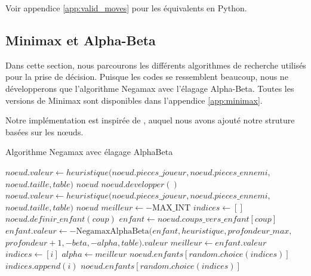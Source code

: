Voir appendice \ref{app:valid_moves} pour les équivalents en Python.

\subsection{Minimax et Alpha-Beta}
\label{subsec:minimax}
Dans cette section, nous parcourons les différents algorithmes de recherche utilisés pour la prise de décision. Puisque les codes se ressemblent beaucoup, nous ne développerons que l'algorithme Negamax avec l'élagage Alpha-Beta. Toutes les versions de Minimax sont disponibles dans l'appendice \ref{app:minimax}.

Notre implémentation est inspirée de \cite{optimisations}, auquel nous avons ajouté notre struture basées sur les nœuds.

\begin{algorithm}[H]
    \caption{Algorithme Negamax avec élagage AlphaBeta}
    \begin{algorithmic}[1]
            \State $noeud.valeur \gets heuristique(noeud.pieces\_joueur, noeud.pieces\_ennemi, $ \Statex \hspace{1\algorithmicindent} $noeud.taille, table)$
            \State \Return $noeud$
        \EndIf
            \State $noeud.developper()$
        \EndIf
            \State $noeud.valeur \gets heuristique(noeud.pieces\_joueur, noeud.pieces\_ennemi, $ \Statex \hspace{1\algorithmicindent} $noeud.taille, table)$
            \State \Return $noeud$
        \EndIf
        \State $meilleur \gets -\text{MAX\_INT}$
        \State $indices \gets []$
                \State $noeud.definir\_enfant(coup)$
            \EndIf
            \State $enfant \gets noeud.coups\_vers\_enfant[coup]$
            \State $enfant.valeur \gets -\text{NegamaxAlphaBeta}(enfant, heuristique, profondeur\_max, $ \Statex \hspace{1\algorithmicindent} $profondeur + 1, -beta, -alpha, table).valeur$
                \State $meilleur \gets enfant.valeur$
                \State $indices \gets [i]$
                    \State $alpha \gets meilleur$
                        \State \Return $noeud.enfants[random.choice(indices)]$
                    \EndIf
                \EndIf
                \State $indices.append(i)$
            \EndIf
        \EndFor
        \State \Return $noeud.enfants[random.choice(indices)]$
    \EndFunction
    \end{algorithmic}
\end{algorithm}

